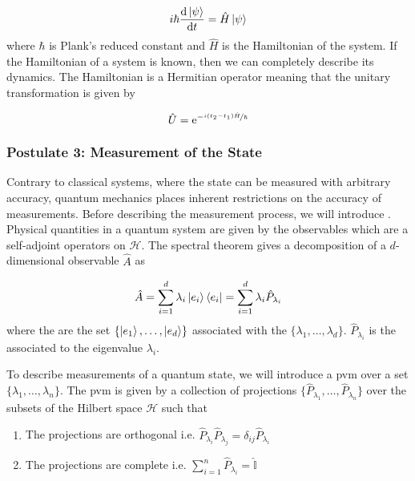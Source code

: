 \begin{equation}
	i \hbar \frac{\mathrm{d}\ket{\psi}}{\mathrm{d}t} = \hat{H}\ket{\psi}
\end{equation}
where $\hbar$ is Plank's reduced constant and $\hat{H}$ is the Hamiltonian of the system. If the Hamiltonian of a system is known, then we can completely describe its dynamics. The Hamiltonian is a Hermitian operator meaning that the unitary transformation is given by

\begin{equation}
	\hat{U} = \mathrm{e}^{-\nicefrac{i(t_2 - t_1)\hat{H}}{\hbar}}
\end{equation}

\subsubsection*{Postulate 3: Measurement of the State}

Contrary to classical systems, where the state can be measured with arbitrary accuracy, quantum mechanics places inherent restrictions on the accuracy of measurements. Before describing the measurement process, we will introduce . Physical quantities in a quantum system are given by the observables which are a self-adjoint operators on $\mathcal{H}$. The spectral theorem gives a decomposition of a $d$-dimensional observable $\hat{A}$ as 

\begin{equation}
	\hat{A} = \sum_{i=1}^d \lambda_i \ket{e_i}\bra{e_i} = \sum_{i=1}^d \lambda_i \hat{P}_{\lambda_i}
\end{equation}
where the  are the set $\{\ket{e_1},\ldots ,\ket{e_d}\}$ associated with the  $\{\lambda_1,\ldots ,\lambda_d\}$. $\hat{P}_{\lambda_i}$ is the  associated to the eigenvalue $\lambda_i$.

To describe measurements of a quantum state, we will introduce a \ac{pvm} over a set $\{\lambda_1, \ldots, \lambda_n\}$. The \ac{pvm} is given by a collection of projections $\{\hat{P}_{\lambda_1},\ldots,\hat{P}_{\lambda_n}\}$ over the subsets of the Hilbert space $\mathcal{H}$ such that

\begin{enumerate}
	\item The projections are orthogonal i.e. $\hat{P}_{\lambda_i}\hat{P}_{\lambda_j} = \delta_{ij}\hat{P}_{\lambda_i}$
	\item The projections are complete i.e. $\sum_{i=1}^n \hat{P}_{\lambda_i} = \hat{\mathbb{I}}$
\end{enumerate}

